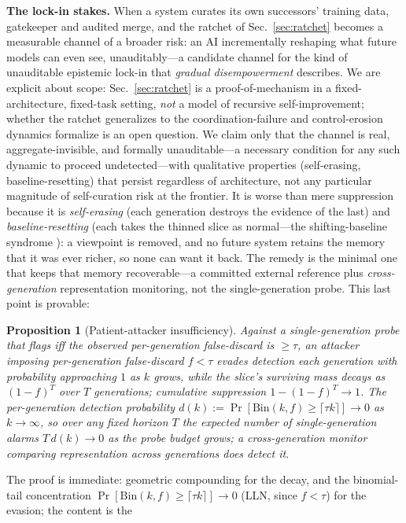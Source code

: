 \documentclass[conference]{IEEEtran}
\newtheorem{proposition}{Proposition}
\begin{document}
\textbf{The lock-in stakes.} When a system curates its own successors' training data, gatekeeper and audited
merge, and the ratchet of Sec.~\ref{sec:ratchet} becomes a measurable channel of a broader risk: an AI
incrementally reshaping what future models can even see, unauditably---a candidate channel for the kind of unauditable epistemic lock-in that \emph{gradual
disempowerment} \cite{kulveit2025} describes. We are explicit about scope: Sec.~\ref{sec:ratchet} is a
proof-of-mechanism in a fixed-architecture, fixed-task setting, \emph{not} a model of recursive self-improvement;
whether the ratchet generalizes to the coordination-failure and control-erosion dynamics \cite{kulveit2025} formalize
is an open question. We claim only that the channel is real, aggregate-invisible, and formally unauditable---a
necessary condition for any such dynamic to proceed undetected---with qualitative properties (self-erasing,
baseline-resetting) that persist regardless of architecture, not any particular magnitude of self-curation risk at
the frontier. It is worse than mere suppression because it is
\emph{self-erasing} (each generation destroys the evidence of the last) and \emph{baseline-resetting} (each takes
the thinned slice as normal---the shifting-baseline syndrome \cite{pauly1995}): a viewpoint is removed, and no future
system retains the memory that it was ever richer, so none can want it back. The remedy is the minimal one
that keeps that memory recoverable---a committed external reference plus \emph{cross-generation} representation
monitoring, not the single-generation probe. This last point is provable:
\begin{proposition}[Patient-attacker insufficiency]\label{prop:patient}
Against a single-generation probe that flags iff the observed per-generation false-discard is $\ge\tau$, an
attacker imposing per-generation false-discard $f<\tau$ evades detection each generation with probability
approaching $1$ as $k$ grows, while the slice's surviving mass decays as $(1-f)^T$ over $T$ generations;
cumulative suppression $1-(1-f)^T\to1$. The per-generation detection probability
$d(k):=\Pr[\mathrm{Bin}(k,f)\ge\lceil\tau k\rceil]\to0$ as $k\to\infty$, so over any fixed horizon $T$ the
expected number of single-generation alarms $T\,d(k)\to0$ as the probe budget grows; a cross-generation
monitor comparing representation across generations does detect it.
\end{proposition}
\noindent The proof is immediate: geometric compounding for the decay, and the binomial-tail concentration
$\Pr[\mathrm{Bin}(k,f)\ge\lceil\tau k\rceil]\to0$ (LLN, since $f<\tau$) for the evasion; the content is the
\end{document}
